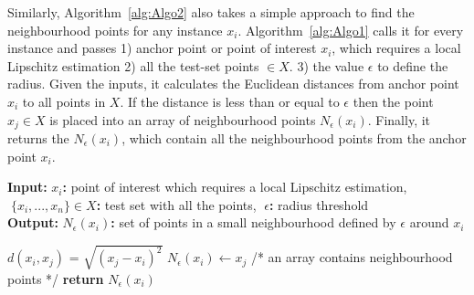 \documentclass[english]{tktltiki2}
\theoremstyle{definition}
\theoremstyle{remark}
\newcommand{\multicommentsymbolstart}{/*}
\newcommand{\multicommentsymbolend}{*/}
\newcommand{\MultiLineComment}[2][\algorithmicindent]{\Statex \hspace{#1}\multicommentsymbolstart{} #2 \multicommentsymbolend{}}
\newcommand{\onespace}{\;}
\begin{document}
Similarly, Algorithm~\ref{alg:Algo2} also takes a simple approach to find the neighbourhood points for any instance $x_i$. Algorithm~\ref{alg:Algo1} calls it for every instance and passes 1) anchor point or point of interest $x_i$, which requires a local Lipschitz estimation 2) all the test-set points $ \in X$. 3) the value $\epsilon$ to define the radius. Given the inputs, it calculates the Euclidean distances from anchor point $x_i$ to all points in $X$. If the distance is less than or equal to $\epsilon$ then the point $x_j \in X$ is placed into an array of neighbourhood points $N_{\epsilon}(x_i)$. Finally, it returns the $N_{\epsilon}(x_i)$, which contain all the neighbourhood points from the anchor point $x_i$.
\begin{algorithm}[H]
	\caption{$Neighborhood(x_i,\onespace X,\onespace \epsilon)$}
	\label{alg:Algo2}
	\hspace*{\algorithmicindent} \textbf{Input}\textbf{:} $x_i$\textbf{:} point of interest which requires a local Lipschitz estimation, $\onespace \{x_i,...,x_n\} \in X$\textbf{:} test set with all the points, $\onespace \epsilon$\textbf{:} radius threshold  \\
	\hspace*{\algorithmicindent} \textbf{Output}\textbf{:} $N_{\epsilon}(x_i)$\textbf{:} set of points in a small neighbourhood defined by $\epsilon$ around $x_i$  
	\begin{algorithmic}[1]
			\State $d(x_i, x_j)$ = $\sqrt{(x_j - x_i)^2}$
				\State $N_{\epsilon}(x_i) \gets x_j$
			\EndIf
		\EndFor
		\MultiLineComment[0\dimexpr\algorithmicindent]{an array contains neighbourhood points}
		\State \textbf{return} $N_{\epsilon}(x_i)$ 
	\end{algorithmic}
\end{algorithm}
\end{document}
